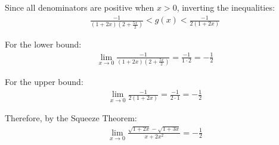 \documentclass{article}
\begin{document}
Since all denominators are positive when $x > 0$, inverting the inequalities:
\begin{align*}
\frac{-1}{(1 + 2x)(2 + \frac{5x}{2})} < g(x) < \frac{-1}{2(1 + 2x)}
\end{align*}

For the lower bound:
\begin{align*}
\lim_{x \to 0} \frac{-1}{(1 + 2x)(2 + \frac{5x}{2})} = \frac{-1}{1 \cdot 2} = -\frac{1}{2}
\end{align*}

For the upper bound:
\begin{align*}
\lim_{x \to 0} \frac{-1}{2(1 + 2x)} = \frac{-1}{2 \cdot 1} = -\frac{1}{2}
\end{align*}

Therefore, by the Squeeze Theorem:
\begin{align*}
\lim_{x \to 0} \frac{\sqrt{1 + 2x} - \sqrt{1 + 3x}}{x + 2x^2} = -\frac{1}{2}
\end{align*}
\end{document}
